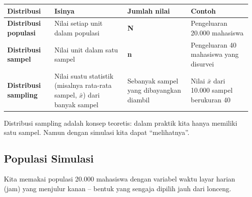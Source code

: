 \documentclass[
  indonesian,
  letterpaper,
]{book}
\newcounter{none} %
\begin{document}
{\def\LTcaptype{none} %
\begin{longtable}[]{@{}
  >{\raggedright\arraybackslash}p{}
  >{\raggedright\arraybackslash}p{}
  >{\raggedleft\arraybackslash}p{}
  >{\raggedright\arraybackslash}p{}@{}}
\toprule\noalign{}
\begin{minipage}[b]{\linewidth}\raggedright
Distribusi
\end{minipage} & \begin{minipage}[b]{\linewidth}\raggedright
Isinya
\end{minipage} & \begin{minipage}[b]{\linewidth}\raggedleft
Jumlah nilai
\end{minipage} & \begin{minipage}[b]{\linewidth}\raggedright
Contoh
\end{minipage} \\
\midrule\noalign{}
\endhead
\bottomrule\noalign{}
\endlastfoot
\textbf{Distribusi populasi} & Nilai setiap unit dalam populasi &
\textbf{N} & Pengeluaran 20.000 mahasiswa \\
\textbf{Distribusi sampel} & Nilai unit dalam satu sampel & \textbf{n} &
Pengeluaran 40 mahasiswa yang disurvei \\
\textbf{Distribusi sampling} & Nilai suatu statistik (misalnya rata-rata
sampel, \(\bar{x}\)) dari banyak sampel & Sebanyak sampel yang
dibayangkan diambil & Nilai \(\bar{x}\) dari 10.000 sampel berukuran
40 \\
\end{longtable}
}

Distribusi sampling adalah konsep teoretis: dalam praktik kita hanya
memiliki satu sampel. Namun dengan simulasi kita dapat ``melihatnya''.

\subsection{Populasi Simulasi}\label{populasi-simulasi}

Kita memakai populasi 20.000 mahasiswa dengan variabel waktu layar
harian (jam) yang menjulur kanan -- bentuk yang sengaja dipilih jauh
dari lonceng.
\end{document}
